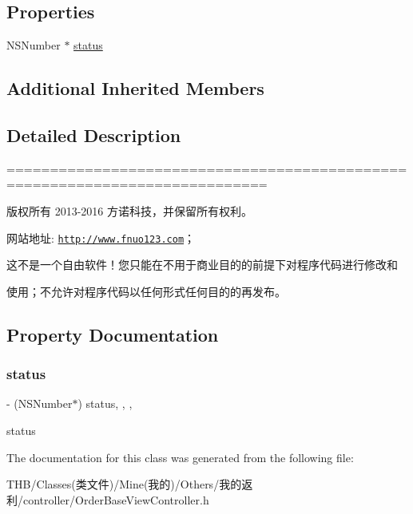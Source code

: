 \subsection*{Properties}
\begin{DoxyCompactItemize}
\item 
N\+S\+Number $\ast$ \mbox{\hyperlink{interface_order_base_view_controller_aae7ba3fda7d426cb297096ae2da3ffc9}{status}}
\end{DoxyCompactItemize}
\subsection*{Additional Inherited Members}


\subsection{Detailed Description}
============================================================================

版权所有 2013-\/2016 方诺科技，并保留所有权利。

网站地址\+: \href{http://www.fnuo123.com}{\tt http\+://www.\+fnuo123.\+com}； 



这不是一个自由软件！您只能在不用于商业目的的前提下对程序代码进行修改和

使用；不允许对程序代码以任何形式任何目的的再发布。 

 

\subsection{Property Documentation}
\mbox{\label{interface_order_base_view_controller_aae7ba3fda7d426cb297096ae2da3ffc9}} 
\subsubsection{\texorpdfstring{status}{status}}
{\footnotesize\ttfamily -\/ (N\+S\+Number$\ast$) status\hspace{0.3cm}{\ttfamily [read]}, {\ttfamily [write]}, {\ttfamily [nonatomic]}, {\ttfamily [strong]}}

status 

The documentation for this class was generated from the following file\+:\begin{DoxyCompactItemize}
\item 
T\+H\+B/\+Classes(类文件)/\+Mine(我的)/\+Others/我的返利/controller/Order\+Base\+View\+Controller.\+h\end{DoxyCompactItemize}
